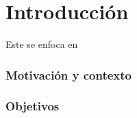 \section{Introducción}
Este  se enfoca en

\subsubsection{Motivación y contexto}

\subsubsection{Objetivos}
